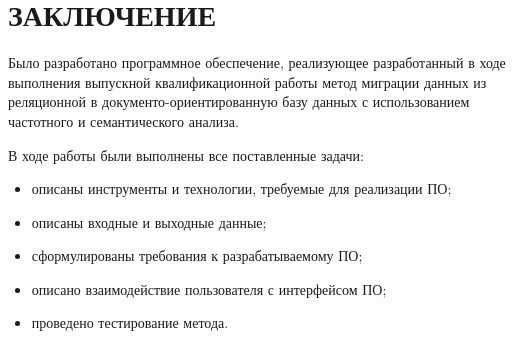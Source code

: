 \chapter*{ЗАКЛЮЧЕНИЕ}

Было разработано программное обеспечение, реализующее разработанный в ходе выполнения
выпускной квалификационной работы метод миграции данных из реляционной в документо-ориентированную
базу данных с использованием частотного и семантического анализа.


В ходе работы были выполнены все поставленные задачи:
\begin{itemize}[label=---]
    \item описаны инструменты и технологии, требуемые для реализации ПО;
    \item описаны входные и выходные данные;
    \item сформулированы требования к разрабатываемому ПО;
    \item описано взаимодействие пользователя с интерфейсом ПО;
    \item проведено тестирование метода.
\end{itemize}